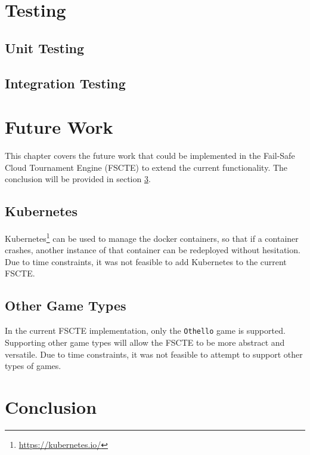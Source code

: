 \documentclass[a4paper, 11pt]{report}
\begin{document}
\chapter{Testing}
\label{chap:testing}

\section{Unit Testing}

\section{Integration Testing}

\chapter{Future Work}
\label{chap:future}

This chapter covers the future work that could be implemented in the Fail-Safe
Cloud Tournament Engine (FSCTE) to extend the current functionality. The
conclusion will be provided in section \ref{chap:conclusion}.

\section{Kubernetes}

Kubernetes\footnote{\url{https://kubernetes.io/}} can be used to manage the docker
containers, so that if a container crashes, another instance of that container
can be redeployed without hesitation. Due to time constraints, it was not feasible
to add Kubernetes to the current FSCTE.

\section{Other Game Types}

In the current FSCTE implementation, only the \texttt{Othello} game is supported.
Supporting other game types will allow the FSCTE to be more abstract and versatile.
Due to time constraints, it was not feasible to attempt to support other types
of games.

\chapter{Conclusion}
\label{chap:conclusion}
\end{document}
